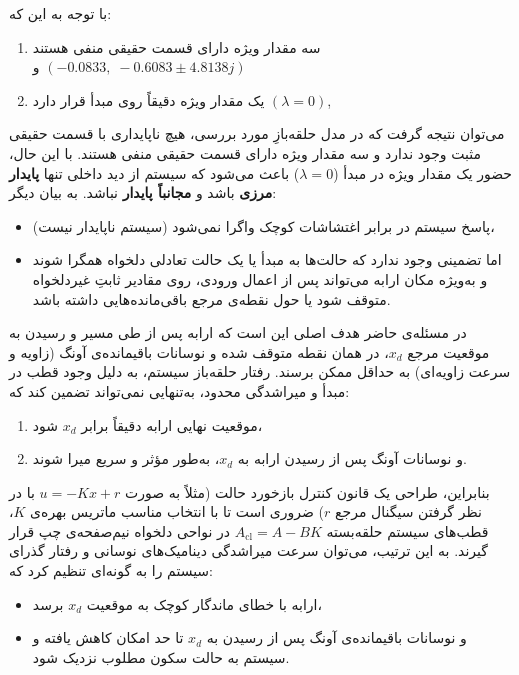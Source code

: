 \documentclass[a4paper,12pt]{article}
\begin{document}
با توجه به این که:
\begin{enumerate}
    \item سه مقدار ویژه دارای قسمت حقیقی منفی هستند
          \(
          (-0.0833,\; -0.6083 \pm 4.8138j)
          \)
          و
    \item یک مقدار ویژه دقیقاً روی مبدأ قرار دارد
          \(
          (\lambda = 0)
          \),
\end{enumerate}
می‌توان نتیجه گرفت که در مدل حلقه‌بازِ مورد بررسی، هیچ  ناپایداری با قسمت حقیقی مثبت وجود ندارد و سه مقدار ویژه دارای قسمت حقیقی منفی هستند. با این حال، حضور یک مقدار ویژه در مبدأ (\(\lambda=0\)) باعث می‌شود که سیستم از دید داخلی تنها \textbf{پایدار مرزی} باشد و \textbf{مجانباً پایدار} نباشد. به بیان دیگر:

\begin{itemize}
    \item پاسخ سیستم در برابر اغتشاشات کوچک واگرا نمی‌شود (سیستم ناپایدار نیست)،
    \item اما تضمینی وجود ندارد که حالت‌ها به مبدأ یا یک حالت تعادلی دلخواه همگرا شوند و به‌ویژه مکان ارابه می‌تواند پس از اعمال ورودی، روی مقادیر ثابتِ غیردلخواه متوقف شود یا حول نقطه‌ی مرجع باقی‌مانده‌هایی داشته باشد.
\end{itemize}

در مسئله‌ی حاضر هدف اصلی این است که ارابه پس از طی مسیر و رسیدن به موقعیت مرجع \(x_d\)، در همان نقطه متوقف شده و نوسانات باقیمانده‌ی آونگ (زاویه و سرعت زاویه‌ای) به حداقل ممکن برسند. رفتار حلقه‌باز سیستم، به دلیل وجود قطب در مبدأ و میراشدگی محدود، به‌تنهایی نمی‌تواند تضمین کند که:

\begin{enumerate}
    \item موقعیت نهایی ارابه دقیقاً برابر \(x_d\) شود،
    \item و نوسانات آونگ پس از رسیدن ارابه به \(x_d\)، به‌طور مؤثر و سریع میرا شوند.
\end{enumerate}

بنابراین، طراحی یک قانون کنترل بازخورد حالت (مثلاً به صورت
\(
u = -Kx + r
\)
با در نظر گرفتن سیگنال مرجع \(r\))
ضروری است تا با انتخاب مناسب ماتریس بهره‌ی \(K\)، قطب‌های سیستم حلقه‌بسته
\(
A_{\text{cl}} = A - BK
\)
در نواحی دلخواه نیم‌صفحه‌ی چپ قرار گیرند. به این ترتیب، می‌توان سرعت میراشدگی دینامیک‌های نوسانی و رفتار گذرای سیستم را به گونه‌ای تنظیم کرد که:

\begin{itemize}
    \item ارابه با خطای ماندگار کوچک به موقعیت \(x_d\) برسد،
    \item و نوسانات باقیمانده‌ی آونگ پس از رسیدن به \(x_d\) تا حد امکان کاهش یافته و سیستم به حالت سکون مطلوب نزدیک شود.
\end{itemize}
\end{document}
